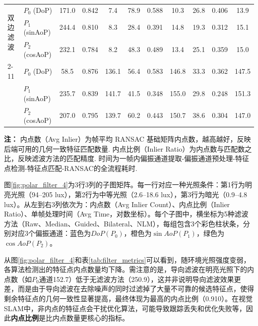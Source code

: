 \begin{table}[t]
\begin{tabular}{llccccccccc}
\multirow{3}{*}{双边滤波}
    & $P_0$ (DoP)     & 171.0 & 0.842 & 7.4  & 78.9  & 0.588 & 10.3 & 26.8  & 0.406 & 13.9 \\
    & $P_1$ (sinAoP)  & 244.4 & 0.810 & 8.3  & 28.4  & 0.391 & 14.8 & 19.3  & 0.312 & 15.1 \\
    & $P_2$ (cosAoP)  & 232.1 & 0.784 & 8.2  & 48.3  & 0.489 & 13.4 & 25.1  & 0.359 & 15.0 \\
\cmidrule{2-11}

\multirow{3}{*}{NLM}
    & $P_0$ (DoP)     & 58.5  & 0.876 & 136.1 & 56.4  & 0.583 & 146.8 & 33.3  & 0.362 & 147.5 \\
    & $P_1$ (sinAoP)  & 235.7 & 0.839 & 141.7 & 41.5  & 0.348 & 155.0 & 29.8  & 0.248 & 151.3 \\
    & $P_2$ (cosAoP)  & 207.0 & 0.795 & 139.7 & 60.2  & 0.443 & 150.7 & 38.6  & 0.304 & 147.0 \\

\midrule
\end{tabular}

\vspace{4pt}
\begin{minipage}{\textwidth}
\footnotesize
\textbf{注：}
内点数（Avg Inlier）为帧平均 RANSAC 基础矩阵内点数，越高越好，反映后端可用的几何一致特征匹配数量.
内点比例（Inlier Ratio）为内点数与匹配数之比，反映滤波方法的匹配精度.
时间为一帧内偏振通道提取-偏振通道预处理-特征点检测-特征点匹配-RANSAC的全流程耗时.
\end{minipage}
\end{table}

图\ref{fig:polar_filter_4}为3行3列的子图矩阵。每一行对应一种光照条件：第1行为明亮光照（94--205 lux），第2行为中等光照（2.6--18.6 lux），第3行为暗光（0.9--4.8 lux）。从左到右3列依次为：内点数（Avg Inlier Count）、内点比例（Inlier Ratio）、单帧处理时间（Avg Time，对数坐标）。每个子图中，横坐标为5种滤波方法（Raw、Median、Guided、Bilateral、NLM），每组包含3个彩色柱状条，分别对应3个偏振通道：蓝色为$DoP(P_0)$，橙色为$\sin AoP(P_1)$，绿色为$\cos AoP(P_2)$。

从图\ref{fig:polar_filter_4}和表\ref{tab:filter_metrics}可以看到，随环境光照强度变弱，各算法检测出的特征点内点数量均下降。需注意的是，导向滤波在明亮光照下的内点数（如$P_0$通道152.7）低于无滤波方法（250.9），这并非说明导向滤波效果更差，而是由于导向滤波在去除噪声的同时过滤掉了大量不可靠的候选特征点，使得剩余特征点的几何一致性显著提高，最终体现为最高的内点比例（0.910）。在视觉SLAM中，非内点的特征点会干扰优化算法，可能导致跟踪丢失和优化失败等，因此\textbf{内点比例}是比内点数量更核心的指标。


